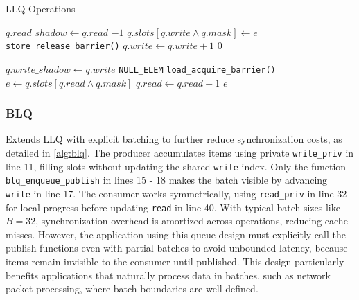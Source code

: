 \begin{algorithm}[!ht]
   \centering
   \captionsetup{justification=centering}
   \caption{\acl{LLQ} Operations \cite{MaffioneCacheAware}}
   \label{alg:llq}
   \scriptsize
   \begin{algorithmic}[1]
            
               \State $q.read\_shadow \gets q.read$ 
                   \State \Return $-1$ 
               \EndIf
           \EndIf
           \State $q.slots[q.write \land q.mask] \gets e$
           \State \texttt{store\_release\_barrier()}
           \State $q.write \gets q.write + 1$
           \State \Return $0$
       \EndFunction
       
       \State
       
            
               \State $q.write\_shadow \gets q.write$ 
                   \State \Return \texttt{NULL\_ELEM}
               \EndIf
           \EndIf
           \State \texttt{load\_acquire\_barrier()}
           \State $e \gets q.slots[q.read \land q.mask]$
           \State $q.read \gets q.read + 1$
           \State \Return $e$
       \EndFunction
   \end{algorithmic}
\end{algorithm}

\subsubsection{\acl{BLQ}}
Extends \ac{LLQ} with explicit batching to further reduce synchronization costs, as detailed in \cref{alg:blq}. The producer accumulates items using private \texttt{write\_priv} in line 11, filling slots without updating the shared \texttt{write} index. Only the function \texttt{blq\_enqueue\_publish} in lines 15 - 18 makes the batch visible by advancing \texttt{write} in line 17. The consumer works symmetrically, using \texttt{read\_priv} in line 32 for local progress before updating \texttt{read} in line 40. With typical batch sizes like $B = 32$, synchronization overhead is amortized across operations, reducing cache misses. However, the application using this queue design must explicitly call the publish functions even with partial batches to avoid unbounded latency, because items remain invisible to the consumer until published. This design particularly benefits applications that naturally process data in batches, such as network packet processing, where batch boundaries are well-defined. \cite{MaffioneCacheAware}

